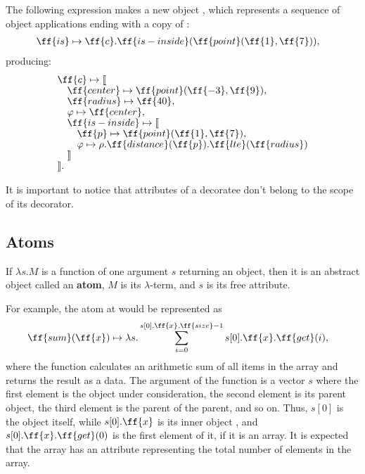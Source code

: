 The following expression makes a new object , which represents
a sequence of object applications ending with a copy of :
\begin{equation}\label{eq:is}
\begin{split}
& \ff{is} \mapsto \ff{c}.\ff{is-inside}(\ff{point}(\ff{1}, \ff{7})),
\end{split}
\end{equation}
producing:
\begin{equation}\label{eq:c-fin2}
\begin{split}
& \ff{c} \mapsto \llbracket \br
& \quad \ff{center} \mapsto \ff{point}(\ff{-3}, \ff{9}), \br
& \quad \ff{radius} \mapsto \ff{40}, \br
& \quad \varphi \mapsto \ff{center}, \br
& \quad \ff{is-inside} \mapsto \llbracket \br
& \quad \quad \ff{p} \mapsto \ff{point}(\ff{1}, \ff{7}), \br
& \quad \quad \varphi \mapsto \rho.\ff{distance}(\ff{p}).\ff{lte}(\ff{radius}) \br
& \quad \rrbracket \br
& \rrbracket.
\end{split}
\end{equation}

It is important to notice that attributes of a decoratee
don't belong to the scope of its decorator.

\subsection{Atoms}

\begin{eodefinition}\label{def:atom}
If $\lambda s.M$ is a function of one argument $s$ returning an object,
then it is an abstract object called an \textbf{atom}, $M$ is its $\lambda$-term,
and $s$ is its free attribute.
\end{eodefinition}

For example, the atom at  would be represented as
\begin{equation}
\begin{split}
& \ff{sum}(\ff{x}) \mapsto \lambda s . \sum\limits_{i=0}^{s[0].\ff{x}.\ff{size} - 1} s[0].\ff{x}.\ff{get}(i),
\end{split}
\end{equation}
where the function calculates an arithmetic sum of all items
in the array  and returns the result as a data. The argument of
the function is a vector $s$ where the first element is the object under
consideration, the second element is its parent object, the third element
is the parent of the parent, and so on. Thus, $s[0]$ is the object
 itself, while $s[0].\ff{x}$ is its inner object ,
and $s[0].\ff{x}.\ff{get}(0)$ is the first element of it, if it is an array.
It is expected that the array has an attribute  representing
the total number of elements in the array.

